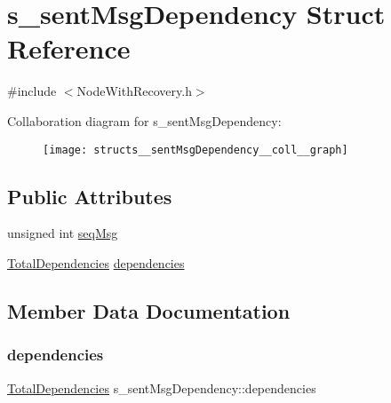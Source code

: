 \hypertarget{structs__sentMsgDependency}{}\section{s\+\_\+sent\+Msg\+Dependency Struct Reference}
\label{structs__sentMsgDependency}


{\ttfamily \#include $<$Node\+With\+Recovery.\+h$>$}



Collaboration diagram for s\+\_\+sent\+Msg\+Dependency\+:\nopagebreak
\begin{figure}[H]
\begin{center}
\leavevmode
\texttt{[image: structs\_\_sentMsgDependency\_\_coll\_\_graph]}
\end{center}
\end{figure}
\subsection*{Public Attributes}
\begin{DoxyCompactItemize}
\item 
unsigned int \hyperlink{structs__sentMsgDependency_afd3ba2f762d695961fed00fb401bc3e7}{seq\+Msg}
\item 
\hyperlink{classTotalDependencies}{Total\+Dependencies} \hyperlink{structs__sentMsgDependency_ab7ece51991fbcba599580914571a32cc}{dependencies}
\end{DoxyCompactItemize}


\subsection{Member Data Documentation}
\mbox{\label{structs__sentMsgDependency_ab7ece51991fbcba599580914571a32cc}} 
\subsubsection{\texorpdfstring{dependencies}{dependencies}}
{\footnotesize\ttfamily \hyperlink{classTotalDependencies}{Total\+Dependencies} s\+\_\+sent\+Msg\+Dependency\+::dependencies}

\mbox{\label{structs__sentMsgDependency_afd3ba2f762d695961fed00fb401bc3e7}} 
